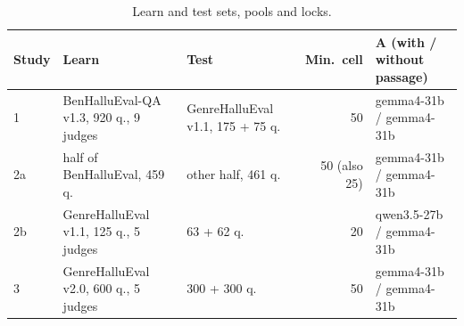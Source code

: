 \documentclass[11pt]{article}
\begin{document}
\begin{table}[h]
\centering\small
\caption{Learn and test sets, pools and locks.}
\begin{tabularx}{\textwidth}{@{}l X X r X@{}}
\toprule
Study & Learn & Test & Min.\ cell & A (with / without passage) \\
\midrule
1 & BenHalluEval-QA v1.3, 920 q., 9 judges & GenreHalluEval v1.1, 175 + 75 q. & 50 & gemma4-31b / gemma4-31b \\
2a & half of BenHalluEval, 459 q. & other half, 461 q. & 50 (also 25) & gemma4-31b / gemma4-31b \\
2b & GenreHalluEval v1.1, 125 q., 5 judges & 63 + 62 q. & 20 & qwen3.5-27b / gemma4-31b \\
3 & GenreHalluEval v2.0, 600 q., 5 judges & 300 + 300 q. & 50 & gemma4-31b / gemma4-31b \\
\bottomrule
\end{tabularx}
\end{table}
\end{document}
